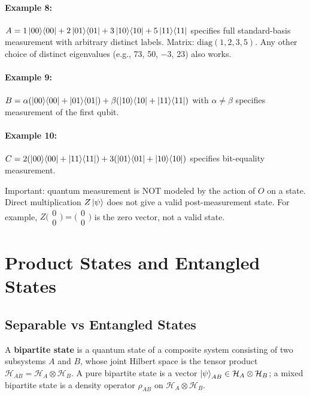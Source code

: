 \documentclass[10pt,a4paper]{article}
\begin{document}
\paragraph{Example 8:} $A=1\ket{00}\!\bra{00}+2\ket{01}\!\bra{01}+3\ket{10}\!\bra{10}+5\ket{11}\!\bra{11}$ specifies full standard-basis measurement with arbitrary distinct labels. Matrix: $\mathrm{diag}(1,2,3,5)$. Any other choice of distinct eigenvalues (e.g., 73, 50, $-3$, 23) also works.

\paragraph{Example 9:} $B=\alpha(\ket{00}\!\bra{00}+\ket{01}\!\bra{01})+\beta(\ket{10}\!\bra{10}+\ket{11}\!\bra{11})$ with $\alpha\neq\beta$ specifies measurement of the first qubit.

\paragraph{Example 10:} $C=2(\ket{00}\!\bra{00}+\ket{11}\!\bra{11})+3(\ket{01}\!\bra{01}+\ket{10}\!\bra{10})$ specifies bit-equality measurement.

Important: quantum measurement is NOT modeled by the action of $O$ on a state. Direct multiplication $Z\ket{\psi}$ does not give a valid post-measurement state. For example, $Z\bigl(\begin{smallmatrix}0\\0\end{smallmatrix}\bigr)=\bigl(\begin{smallmatrix}0\\0\end{smallmatrix}\bigr)$ is the zero vector, not a valid state.

\section{Product States and Entangled States}

\subsection{Separable vs Entangled States}

\begin{tcolorbox}[defstyle, title={Definition: Bipartite State}]
A \textbf{bipartite state} is a quantum state of a composite system consisting of two subsystems $A$ and $B$, whose joint Hilbert space is the tensor product $\mathcal{H}_{AB}=\mathcal{H}_A\otimes\mathcal{H}_B$. A pure bipartite state is a vector $\ket{\psi}_{AB}\in\mathcal{H}_A\otimes\mathcal{H}_B$; a mixed bipartite state is a density operator $\rho_{AB}$ on $\mathcal{H}_A\otimes\mathcal{H}_B$.
\end{tcolorbox}
\end{document}

